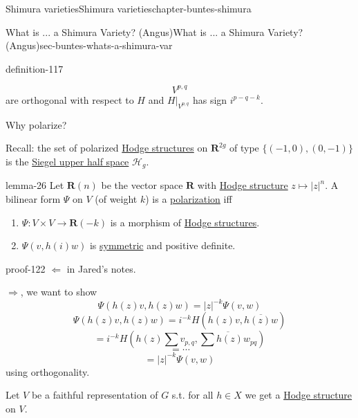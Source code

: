 \documentclass[oneside,10pt,]{book}
\numberwithin{equation}{section}
\newcommand{\RR}{\mathbf{R}}
\begin{document}
\begin{chapterptx}{Shimura varieties}{}{Shimura varieties}{}{}{chapter-buntes-shimura}
\begin{sectionptx}{What is ... a Shimura Variety? (Angus)}{}{What is ... a Shimura Variety? (Angus)}{}{}{sec-buntes-whats-a-shimura-var}
\begin{definition}{}{definition-117}
\begin{enumerate}
\begin{equation*}
V^{p,q}
\end{equation*}
are orthogonal with respect to \(H\) and \(H|_{V^{p,q}}\) has sign \(i^{p-q- k}\).%
\end{enumerate}
%
\end{definition}
\hypertarget{p-1228}{}%
Why polarize?%
\par
\hypertarget{p-1229}{}%
Recall: the set of polarized \hyperref[def-hodge-str]{Hodge structures} on \(\RR^{2g}\) of type \(\{(-1,0), (0,-1)\}\) is the \hyperref[def-siegel-space]{Siegel upper half space} \(\mathcal H_g\).%
\begin{lemma}{}{}{lemma-26}%
\hypertarget{p-1230}{}%
Let \(\RR(n) \) be the vector space \(\RR\) with \hyperref[def-hodge-str]{Hodge structure} \(z\mapsto |z|^n\). A bilinear form \(\Psi\) on \(V\) (of weight \(k\)) is a \hyperref[def-c-pol]{polarization} iff\leavevmode%
\begin{enumerate}
\item\hypertarget{li-296}{}\(\Psi\colon V\times V \to \RR(-k)\) is a morphism of  \hyperref[def-hodge-str]{Hodge structures}.%
\item\hypertarget{li-297}{}\(\Psi(v, h(i) w)\) is \hyperref[def-princ-pol]{symmetric} and positive definite.%
\end{enumerate}
%
\end{lemma}
\begin{proofptx}{}{proof-122}
\hypertarget{p-1231}{}%
\(\Leftarrow\) in Jared's notes.%
\par
\hypertarget{p-1232}{}%
\(\Rightarrow\), we want to show%
\begin{equation*}
\Psi(h(z) v, h(z) w) = |z|^{-k} \Psi(v,w)
\end{equation*}
%
\begin{equation*}
\Psi(h(z) v, h(z) w) = i^{-k} H(h(z) v, \overline{h(z) w})
\end{equation*}
%
\begin{equation*}
=  i^{-k} H(h(z) \sum v_{p,q}, \overline { \sum h(z) w_{pq}})
\end{equation*}
%
\begin{equation*}
= \cdots
\end{equation*}
%
\begin{equation*}
= |z|^{-k} \Psi(v,w)
\end{equation*}
using orthogonality.%
\end{proofptx}
\hypertarget{p-1233}{}%
Let \(V \) be a faithful representation of \(G \) s.t. for all \(h\in X\) we get  a \hyperref[def-hodge-str]{Hodge structure} on \(V\).%

\end{sectionptx}
\end{chapterptx}
\end{document}
